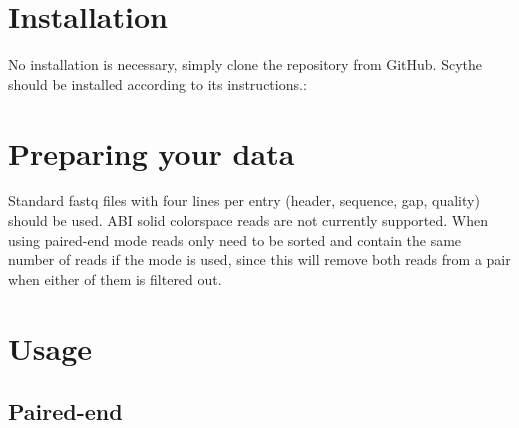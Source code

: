 \documentclass[letterpaper,10pt,english]{sphinxmanual}
\begin{document}
\section{Installation}
\label{\detokenize{intro:installation}}
No installation is necessary, simply clone the repository from GitHub. Scythe should be installed according to its instructions.:

\begin{sphinxVerbatim}[commandchars=\\\{\}]
  
\end{sphinxVerbatim}


\section{Preparing your data}
\label{\detokenize{intro:preparing-your-data}}
Standard fastq files with four lines per entry (header, sequence, gap, quality) should be used.  ABI solid colorspace reads are not currently supported.  When using paired-end mode reads only need to be sorted and contain the same number of reads if the  mode is used, since this will remove both reads from a pair when either of them is filtered out.


\section{Usage}
\label{\detokenize{intro:usage}}

\subsection{Paired-end}
\label{\detokenize{intro:paired-end}}\begin{quote}

\begin{sphinxVerbatim}[commandchars=\\\{\}]
              
\end{sphinxVerbatim}
\end{quote}
\end{document}
